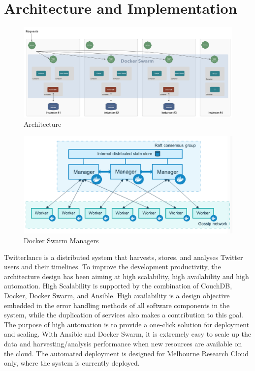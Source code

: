 \section{Architecture and Implementation}
\begin{figure}
\centering
\includegraphics[width=6in]{Figures/Overview.png}
\caption{Architecture \label{Architecture}}
\end{figure}
\begin{figure}
\centerline{\includegraphics[width=6in]{Figures/swarm-diagram.png}}
\caption{Docker Swarm Managers \label{Docker Sarm Managers}}
\label{docker manager}
\vspace{-0.5cm}
\end{figure}

Twitterlance is a distributed system that harvests, stores, and analyses Twitter users and their timelines. To improve the development productivity, the architecture design has been aiming at high scalability, high availability and high automation. High Scalability is supported by the combination of CouchDB, Docker, Docker Swarm, and Ansible. High availability is a design objective embedded in the error handling methods of all software components in the system, while the duplication of services also makes a contribution to this goal. The purpose of high automation is to provide a one-click solution for deployment and scaling. With Ansible and Docker Swarm, it is extremely easy to scale up the data and harvesting/analysis performance when new resources are available on the cloud. The automated deployment is designed for Melbourne Research Cloud only, where the system is currently deployed.

